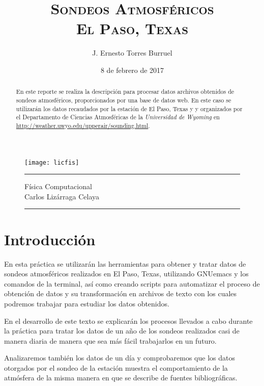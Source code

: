 \documentclass[12pt]{article}
\title{\huge \textbf{\textsc{Sondeos Atmosféricos\\ El Paso, Texas}}}%
\author{J. Ernesto Torres Burruel}
\date{8 de febrero de 2017}
\begin{document}
\begin{titlepage}%

\begin{figure}[h!]
    \centering
    \texttt{[image: licfis]}
    \\[2 cm]
    \hrule
    \maketitle
    {\Large Física Computacional\\Carlos Lizárraga Celaya}
    \bigskip
    \hrule
    \thispagestyle{empty}
\end{figure}
 \begin{abstract}
    En este reporte se realiza la descripción para procesar datos archivos obtenidos de sondeos atmosféricos, proporcionados por una base de datos web. En este caso se utilizarán los datos recaudados por la estación de El Paso, Texas y y organizados por el Departamento de Ciencias Atmosféricas de la \textit{Universidad de Wyoming} en \url{http://weather.uwyo.edu/upperair/sounding.html}.
   
    \end{abstract} 

\end{titlepage}

\newpage

\tableofcontents
\setcounter{page}{2}
\newpage

\section{Introducción}
En esta práctica se utilizarán las herramientas para obtener y tratar datos de sondeos atmosféricos realizados en El Paso, Texas, utilizando GNUemacs y los comandos de la terminal, así como creando scripts para automatizar el proceso de obtención de datos y su transformación en archivos de texto con los cuales podremos trabajar para estudiar los datos obtenidos.

En el desarrollo de este texto se explicarán los procesos llevados a cabo durante la práctica para tratar los datos de un año de los sondeos realizados casi de manera diaria de manera que sea más fácil trabajarlos en un futuro.

Analizaremos también los datos de un día y comprobaremos que los datos otorgados por el sondeo de la estación muestra el comportamiento de la atmósfera de la misma manera en que se describe de fuentes bibliográficas.
\end{document}
